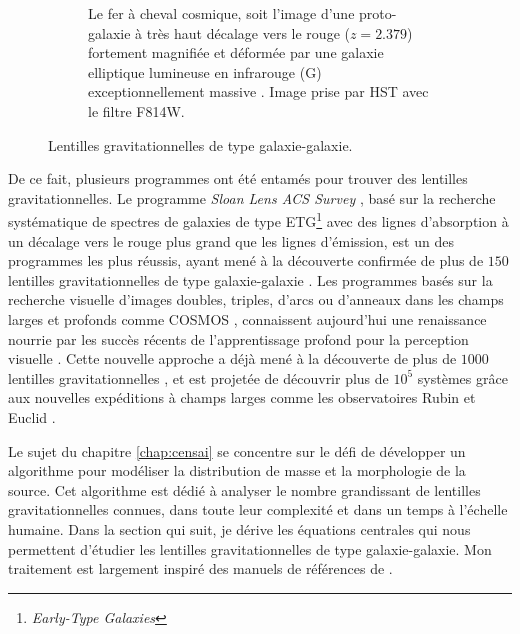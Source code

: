 \begin{figure}[tb!]
\begin{subfigure}[t]{0.45\textwidth}
                \caption{Le fer à cheval cosmique, soit l'image d'une proto-galaxie à très haut décalage vers le rouge 
                        ($z=2.379$) fortement magnifiée et déformée par une galaxie elliptique lumineuse en infrarouge (G) exceptionnellement massive 
                        \citep[${5.2\times 10^{12}\, h_{72}^{-1}\, M_\odot}$,][]{Schuldt2019}. 
                 Image prise par HST avec le filtre F814W.}
                \label{fig:sdssj1148}
        \end{subfigure}
        \caption{Lentilles gravitationnelles de type galaxie-galaxie.}
        \label{fig:important lenses}
\end{figure}
 

De ce fait, plusieurs programmes ont été entamés pour trouver des lentilles gravitationnelles. Le programme 
\textit{Sloan Lens ACS Survey} \citep[SLAC,][]{Bolton2005,Bolton2006}, basé sur la recherche systématique de spectres de galaxies de type ETG\footnote{\textit{Early-Type Galaxies}} 
avec des lignes d'absorption à un décalage vers le rouge plus grand que les lignes d'émission, 
est un des programmes les plus réussis, ayant mené à la découverte 
confirmée de plus de $150$ lentilles gravitationnelles de type galaxie-galaxie \citep{Bolton2008,Shu2017}. Les programmes 
basés sur la recherche visuelle d'images doubles, triples, d'arcs ou d'anneaux \citep[e.g.][]{Faure2008} dans les champs larges et profonds comme 
COSMOS \citep{Koekemoer2007,Scoville2007}, connaissent aujourd'hui une renaissance nourrie par les succès récents de l'apprentissage profond 
pour la perception visuelle \citep{Krizhevsky2012}. Cette nouvelle approche a déjà mené à la découverte de plus de $1000$ lentilles 
gravitationnelles \citep{Petrillo2017,Huang2021}, et est projetée de découvrir plus de $10^{5}$ systèmes grâce aux nouvelles expéditions 
à champs larges comme les observatoires Rubin \citep{lsst2009} et Euclid \citep{Euclid2010}.


Le sujet du chapitre \ref{chap:censai} se concentre sur le défi de développer un algorithme pour modéliser la distribution de masse et 
la morphologie de la source. Cet algorithme est dédié à analyser le nombre grandissant
de lentilles gravitationnelles connues, dans toute leur complexité et dans un temps à l'échelle humaine. 
Dans la section qui suit, je dérive les équations centrales qui nous permettent 
d'étudier les lentilles gravitationnelles de type galaxie-galaxie.
Mon traitement est largement inspiré 
des manuels de références de \citet{Meneghetti2013,Congdon2018}. 


